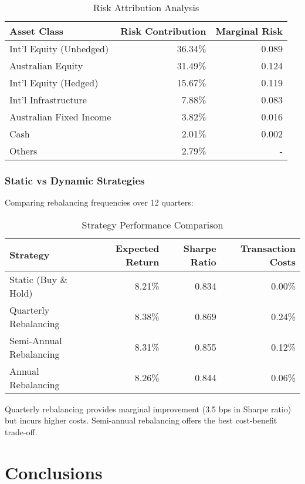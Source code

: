 \documentclass[12pt,a4paper]{article}
\begin{document}
\begin{table}[H]
\centering
\caption{Risk Attribution Analysis}
\begin{tabular}{lrr}
\toprule
Asset Class & Risk Contribution & Marginal Risk \\
\midrule
Int'l Equity (Unhedged) & 36.34\% & 0.089 \\
Australian Equity & 31.49\% & 0.124 \\
Int'l Equity (Hedged) & 15.67\% & 0.119 \\
Int'l Infrastructure & 7.88\% & 0.083 \\
Australian Fixed Income & 3.82\% & 0.016 \\
Cash & 2.01\% & 0.002 \\
Others & 2.79\% & - \\
\bottomrule
\end{tabular}
\end{table}

\subsubsection{Static vs Dynamic Strategies}
Comparing rebalancing frequencies over 12 quarters:

\begin{table}[H]
\centering
\caption{Strategy Performance Comparison}
\begin{tabular}{lrrr}
\toprule
Strategy & Expected Return & Sharpe Ratio & Transaction Costs \\
\midrule
Static (Buy \& Hold) & 8.21\% & 0.834 & 0.00\% \\
Quarterly Rebalancing & 8.38\% & 0.869 & 0.24\% \\
Semi-Annual Rebalancing & 8.31\% & 0.855 & 0.12\% \\
Annual Rebalancing & 8.26\% & 0.844 & 0.06\% \\
\bottomrule
\end{tabular}
\end{table}

Quarterly rebalancing provides marginal improvement (3.5 bps in Sharpe ratio) but incurs higher costs. Semi-annual rebalancing offers the best cost-benefit trade-off.

\section{Conclusions}
\end{document}
